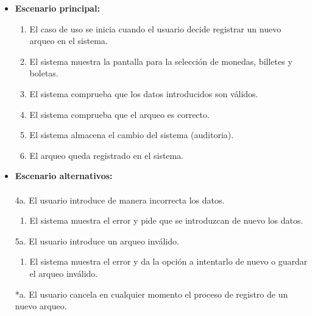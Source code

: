 \begin{itemize}\renewcommand{\labelitemi}{$\circ$}
 \item \textbf{Escenario principal:}
         \begin{enumerate}
          \item El caso de uso se inicia cuando el usuario decide registrar un nuevo arqueo en el sistema.
	\item El sistema muestra la pantalla para la selección de monedas, billetes y boletas.
	   \item El sistema comprueba que los datos introducidos son válidos.
	\item El sistema comprueba que el arqueo es correcto.
 	  \item El sistema almacena el cambio del sistema (auditoria).
          \item El arqueo queda registrado en el sistema.
         \end{enumerate}
  \item \textbf{Escenario alternativos:}\\\\
	4a. El usuario introduce de manera incorrecta los datos.
		\begin{enumerate}
		 \item El sistema muestra el error y pide que se introduzcan de nuevo los datos.
		\end{enumerate}
	5a. El usuario introduce un arqueo inválido.
		\begin{enumerate}
		 \item El sistema muestra el error y da la opción a intentarlo de nuevo o guardar el arqueo inválido.
		\end{enumerate}
          *a. El usuario cancela en cualquier momento el proceso de registro de un nuevo arqueo.
\end{itemize}

